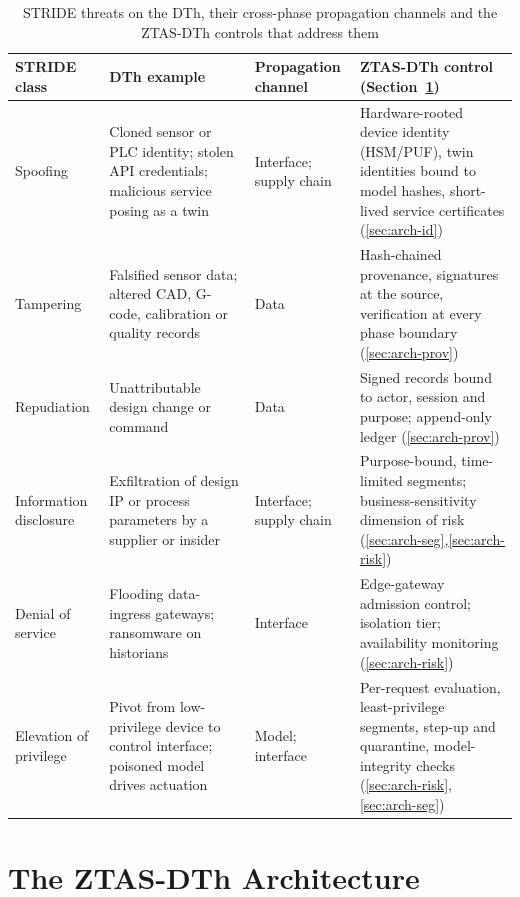\documentclass[journal]{IEEEtran}
\newcommand{\ztas}{ZTAS-DTh}
\begin{document}
\begin{table}[!t]
\centering
\caption{STRIDE threats on the DTh, their cross-phase propagation channels and the \ztas{} controls that address them}
\label{tab:stride}
\footnotesize
\renewcommand{\arraystretch}{1.1}
\begin{tabular}{@{}p{2.1cm} p{4.6cm} p{3.6cm} p{6.1cm}@{}}
\toprule
STRIDE class & DTh example & Propagation channel & \ztas{} control (Section~\ref{sec:arch}) \\
\midrule
Spoofing & Cloned sensor or PLC identity; stolen API credentials; malicious service posing as a twin & Interface; supply chain & Hardware-rooted device identity (HSM/PUF), twin identities bound to model hashes, short-lived service certificates (\ref{sec:arch-id}) \\
Tampering & Falsified sensor data; altered CAD, G-code, calibration or quality records & Data & Hash-chained provenance, signatures at the source, verification at every phase boundary (\ref{sec:arch-prov}) \\
Repudiation & Unattributable design change or command & Data & Signed records bound to actor, session and purpose; append-only ledger (\ref{sec:arch-prov}) \\
Information disclosure & Exfiltration of design IP or process parameters by a supplier or insider & Interface; supply chain & Purpose-bound, time-limited segments; business-sensitivity dimension of risk (\ref{sec:arch-seg},\ref{sec:arch-risk}) \\
Denial of service & Flooding data-ingress gateways; ransomware on historians & Interface & Edge-gateway admission control; isolation tier; availability monitoring (\ref{sec:arch-risk}) \\
Elevation of privilege & Pivot from low-privilege device to control interface; poisoned model drives actuation & Model; interface & Per-request evaluation, least-privilege segments, step-up and quarantine, model-integrity checks (\ref{sec:arch-risk},\ref{sec:arch-seg}) \\
\bottomrule
\end{tabular}
\end{table}

\section{The \ztas{} Architecture}
\label{sec:arch}
\end{document}
